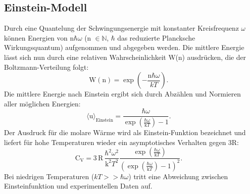 \subsection{Einstein-Modell}
\label{sec:Einstein-Modell}
Durch eine Quantelung der Schwingungsenergie mit konstanter Kreisfrequenz $\omega$
können Energien von n$\hbar\omega$ (n $\in \mathds{N}$, $\hbar$ das reduzierte Plancksche Wirkungsquantum) aufgenommen und abgegeben werden.
Die mittlere Energie lässt sich nun durch eine relativen Wahrscheinlichkeit W(n)
ausdrücken, die der Boltzmann-Verteilung folgt:
\begin{equation}
  \text{W}(\text{n}) = \exp{\left(-\frac{\text{n}\hbar\omega}{kT}\right)}.
\end{equation}
Die mittlere Energie nach Einstein ergibt sich durch Abzählen und Normieren aller möglichen Energien:
\begin{equation}
  \langle \text{u} \rangle_\text{Einstein} = \frac{\hbar\omega}{\exp{\left(\frac{\hbar\omega}{\text{k}T}\right)}-1}.
\end{equation}
Der Ausdruck für die molare Wärme wird als Einstein-Funktion bezeichnet
und liefert für hohe Temperaturen wieder ein asymptotisches Verhalten gegen 3R:
\begin{equation}
  \text{C}_\text{V} = 3\,\text{R}\,\frac{\hbar^2\omega^2}{\text{k}^2T^2}\frac{\exp{\left(\frac{\hbar\omega}{\text{k}T}\right)}}{(\exp{\left(\frac{\hbar\omega}{\text{k}T}\right)}-1)^2}.
\end{equation}
Bei niedrigen Temperaturen ($kT >> \hbar\omega$) tritt eine Abweichung zwischen Einsteinfunktion und experimentellen Daten auf.

